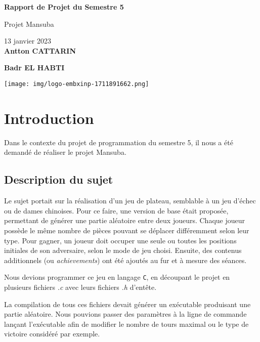 \documentclass[a4paper]{article}
\begin{document}
\begin{titlepage}
\begin{center}
\vspace*{2cm}
\Huge
\textbf{Rapport de Projet du Semestre 5}

\vspace{0.5cm}
\huge
Projet Mansuba
            
\vspace{0.5cm}
\Large
13 janvier 2023 \\

\vfill
\huge
\textbf{Antton CATTARIN}

\textbf{Badr EL HABTI}
       
\vfill

\texttt{[image: img/logo-embxinp-1711891662.png]}

\vspace{0.8cm}
\end{center}
\end{titlepage}

\newpage
\tableofcontents 

\listoffigures
\newpage

\section{Introduction}
\label{intro}

Dans le contexte du projet de programmation du semestre 5, il nous a été demandé de réaliser le projet Mansuba.

\subsection{Description du sujet}
\label{description}
Le sujet portait sur la réalisation d'un jeu de plateau, semblable à un jeu d'échec ou de dames chinoises. Pour ce faire, une version de base était proposée, permettant de générer une partie aléatoire entre deux joueurs. Chaque joueur possède le même nombre de pièces pouvant se déplacer différemment selon leur type. Pour gagner, un joueur doit occuper une seule ou toutes les positions initiales de son adversaire, selon le mode de jeu choisi. Ensuite, des contenus additionnels (ou \emph{achievements}) ont été ajoutés au fur et à mesure des séances.

Nous devions programmer ce jeu en langage \verb|C|, en découpant le projet en plusieurs fichiers \emph{.c} avec leurs fichiers \emph{.h} d'entête.

La compilation de tous ces fichiers devait générer un exécutable produisant une partie aléatoire. Nous pouvions passer des paramètres à la ligne de commande lançant l'exécutable afin de modifier le nombre de tours maximal ou le type de victoire considéré par exemple.
\end{document}
